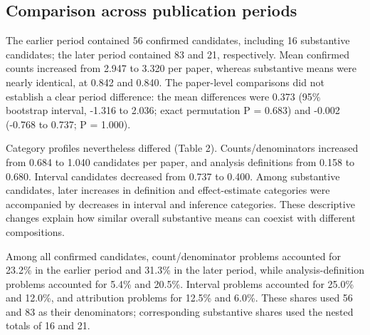 \documentclass[11pt,a4paper]{article}
\begin{document}
\subsection{Comparison across publication periods}
The earlier period contained 56 confirmed candidates, including 16 substantive candidates; the later period contained 83 and 21, respectively. Mean confirmed counts increased from 2.947 to 3.320 per paper, whereas substantive means were nearly identical, at 0.842 and 0.840. The paper-level comparisons did not establish a clear period difference: the mean differences were 0.373 (95\% bootstrap interval, -1.316 to 2.036; exact permutation P = 0.683) and -0.002 (-0.768 to 0.737; P = 1.000).\par
Category profiles nevertheless differed (Table 2). Counts/denominators increased from 0.684 to 1.040 candidates per paper, and analysis definitions from 0.158 to 0.680. Interval candidates decreased from 0.737 to 0.400. Among substantive candidates, later increases in definition and effect-estimate categories were accompanied by decreases in interval and inference categories. These descriptive changes explain how similar overall substantive means can coexist with different compositions.\par
Among all confirmed candidates, count/denominator problems accounted for 23.2\% in the earlier period and 31.3\% in the later period, while analysis-definition problems accounted for 5.4\% and 20.5\%. Interval problems accounted for 25.0\% and 12.0\%, and attribution problems for 12.5\% and 6.0\%. These shares used 56 and 83 as their denominators; corresponding substantive shares used the nested totals of 16 and 21.\par
\end{document}
